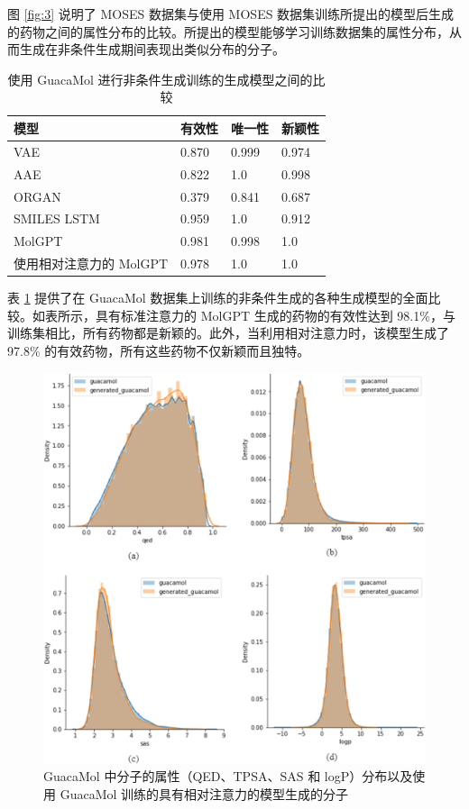 图 \ref{fig:3} 说明了 MOSES 数据集与使用 MOSES 数据集训练所提出的模型后生成的药物之间的属性分布的比较。所提出的模型能够学习训练数据集的属性分布，从而生成在非条件生成期间表现出类似分布的分子。

\begin{table}[H]
  \centering
  \caption{使用 GuacaMol 进行非条件生成训练的生成模型之间的比较}
  \label{tab:2}
  \begin{tabular}{llll}
    \hline 模型 & 有效性 & 唯一性 & 新颖性 \\
    \hline VAE & 0.870 & 0.999 & 0.974 \\
    AAE & 0.822 & 1.0 & 0.998 \\
    ORGAN & 0.379 & 0.841 & 0.687 \\
    SMILES LSTM & 0.959 & 1.0 & 0.912 \\
    MolGPT & 0.981 & 0.998 & 1.0 \\
    使用相对注意力的 MolGPT & 0.978 & 1.0 & 1.0 \\
    \hline
    \end{tabular}
\end{table}

表 \ref{tab:2} 提供了在 GuacaMol 数据集上训练的非条件生成的各种生成模型的全面比较。如表所示，具有标准注意力的 MolGPT 生成的药物的有效性达到 98.1\%，与训练集相比，所有药物都是新颖的。此外，当利用相对注意力时，该模型生成了 97.8\% 的有效药物，所有这些药物不仅新颖而且独特。

\begin{figure}[H]
  \centering
  \includegraphics[width=\linewidth]{figures/4.png}
  \caption{GuacaMol 中分子的属性（QED、TPSA、SAS 和 logP）分布以及使用 GuacaMol 训练的具有相对注意力的模型生成的分子}
  \label{fig:4}
\end{figure}

